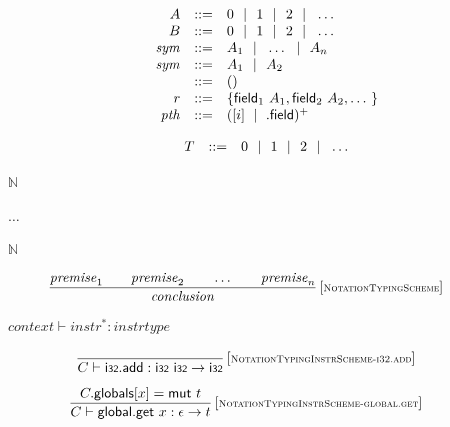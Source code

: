 \vspace{1ex}

$$
\begin{array}[t]{@{}lrrl@{}l@{}}
& A & ::= & 0 ~~|~~ 1 ~~|~~ 2 ~~|~~ \dots \\
& B & ::= & 0 ~~|~~ 1 ~~|~~ 2 ~~|~~ \dots \\
& {\mathit{sym}} & ::= & A_1 ~~|~~ \ldots ~~|~~ A_n \\
& {\mathit{sym}} & ::= & A_1 ~~|~~ A_2 \\
& & ::= & () \\
& r & ::= & \{ \begin{array}[t]{@{}l@{}l@{}}
{\mathsf{field}}_{1}~A_1 ,  {\mathsf{field}}_{2}~A_2 ,  \ldots~ \} \\
\end{array} \\
& {\mathit{pth}} & ::= & {({}[ i ]~\mid~{.}\mathsf{field})^{+}} \\
\end{array}
$$

\vspace{1ex}

$$
\begin{array}[t]{@{}lrrl@{}l@{}}
& T & ::= & 0 ~~|~~ 1 ~~|~~ 2 ~~|~~ \dots \\
\end{array}
$$

$\boxed{\mathbb{N}}$

$\boxed{\ldots}$

$\boxed{\mathbb{N}}$

$$
\begin{array}{@{}c@{}}\displaystyle
\frac{
{\mathit{premise}}_1
 \qquad
{\mathit{premise}}_2
 \qquad
\ldots
 \qquad
{\mathit{premise}}_n
}{
{\mathit{conclusion}}
} \, {[\textsc{\scriptsize NotationTypingScheme}]}
\qquad
\end{array}
$$

$\boxed{{\mathit{context}} \vdash {{\mathit{instr}}^\ast} : {\mathit{instrtype}}}$

$$
\begin{array}{@{}c@{}}\displaystyle
\frac{
}{
C \vdash \mathsf{i{\scriptstyle 32}} {.} \mathsf{add} : \mathsf{i{\scriptstyle 32}}~\mathsf{i{\scriptstyle 32}} \rightarrow \mathsf{i{\scriptstyle 32}}
} \, {[\textsc{\scriptsize NotationTypingInstrScheme{-}i32.add}]}
\qquad
\end{array}
$$

$$
\begin{array}{@{}c@{}}\displaystyle
\frac{
C{.}\mathsf{globals}{}[x] = \mathsf{mut}~t
}{
C \vdash \mathsf{global{.}get}~x : \epsilon \rightarrow t
} \, {[\textsc{\scriptsize NotationTypingInstrScheme{-}global.get}]}
\qquad
\end{array}
$$

